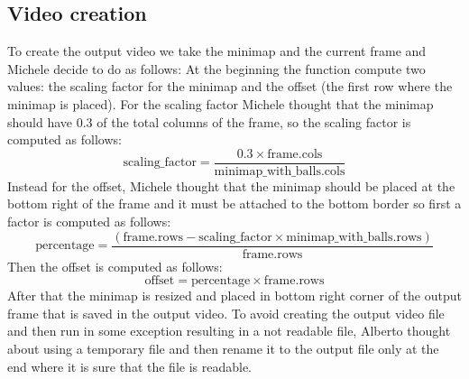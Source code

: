 \subsection{Video creation}
To create the output video we take the minimap and the current frame and Michele decide to do as follows:
At the beginning the function compute two values: the scaling factor for the minimap and the offset
(the first row where the minimap is placed). For the scaling factor Michele thought that
the minimap should have 0.3 of the total columns of the frame, so the scaling factor is computed as follows:
\begin{equation}
	\text{scaling\_factor} = \frac{0.3 \times \text{frame.cols}}{\text{minimap\_with\_balls.cols}}
\end{equation}
Instead for the offset, Michele thought that the minimap should be placed at the bottom right of the frame
and it must be attached to the bottom border so first a factor is computed as follows:
\begin{equation}
	\text{percentage} = \frac{(\text{frame.rows} - \text{scaling\_factor} \times \text{minimap\_with\_balls.rows})}{\text{frame.rows}}
\end{equation}
Then the offset is computed as follows:
\begin{equation}
	\text{offset} = \text{percentage} \times \text{frame.rows}
\end{equation}
After that the minimap is resized and placed in bottom right corner of the output frame that
is saved in the output video.
To avoid creating the output video file and then run in some exception resulting in a not readable file,
Alberto thought about using a temporary file and then rename it to the output file only at the end where
it is sure that the file is readable.
